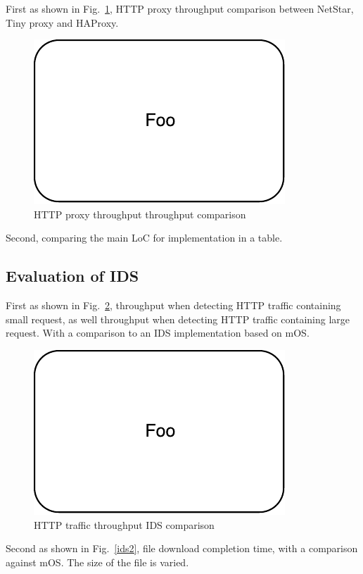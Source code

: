 First as shown in Fig.~\ref{http1}, HTTP proxy throughput comparison between NetStar, Tiny proxy and HAProxy.

\begin{figure}[!t]
  \centering
  \includegraphics[width=0.5\columnwidth]{figure/foo.pdf}
  \caption{HTTP proxy throughput throughput comparison}
  \label{http1}
\end{figure}

Second, comparing the main LoC for implementation in a table.

\subsection{Evaluation of IDS}

First as shown in Fig.~\ref{ids1}, throughput when detecting HTTP traffic containing small request, as well throughput when detecting HTTP traffic containing large request. With a comparison to an IDS implementation based on mOS.

\begin{figure}[!t]
  \centering
  \includegraphics[width=0.5\columnwidth]{figure/foo.pdf}
  \caption{HTTP traffic throughput IDS comparison}
  \label{ids1}
\end{figure}

Second as shown in Fig.~\ref{ids2}, file download completion time, with a comparison against mOS. The size of the file is varied.

